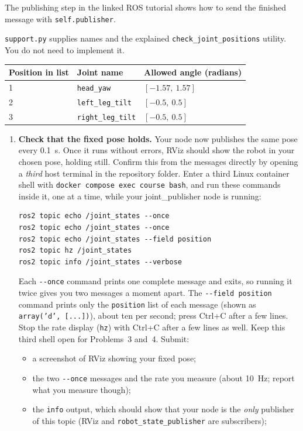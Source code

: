 \documentclass[12pt,letterpaper]{article}
\begin{document}
\begin{enumerate}[start=2]
\begin{enumerate}
The publishing step in the linked ROS
tutorial shows how to send the finished message with \texttt{self.publisher}.
\end{enumerate}
\texttt{support.py} supplies names and the explained
\texttt{check\_joint\_positions} utility. You do not need to implement it.

\begin{center}
\begin{tabular}{lll}
\hline
Position in list & Joint name & Allowed angle (radians) \\
\hline
1 & \texttt{head\_yaw} & $[-1.57,\ 1.57]$ \\
2 & \texttt{left\_leg\_tilt} & $[-0.5,\ 0.5]$ \\
3 & \texttt{right\_leg\_tilt} & $[-0.5,\ 0.5]$ \\
\hline
\end{tabular}
\end{center}

\begin{enumerate}[start=3]
\item \textbf{Check that the fixed pose holds.}
Your node now publishes the same pose every 0.1~s. Once it runs without
errors, RViz should show the robot in your chosen pose, holding still.
Confirm this from the messages directly by opening a \emph{third} host terminal
in the repository folder. Enter a third Linux container shell with
\texttt{docker compose exec course bash}, and run these commands inside it,
one at a time, while your joint\_publisher node is running:
\begin{lstlisting}
ros2 topic echo /joint_states --once
ros2 topic echo /joint_states --once
ros2 topic echo /joint_states --field position
ros2 topic hz /joint_states
ros2 topic info /joint_states --verbose
\end{lstlisting}
Each \texttt{-{}-once} command prints one complete message and exits, so
running it twice gives you two messages a moment apart. The
\texttt{-{}-field position} command prints only the \texttt{position} list of
each message (shown as \texttt{array('d', [...])}), about ten per second;
press Ctrl+C after a few lines. Stop the rate display (\texttt{hz}) with
Ctrl+C after a few lines as well. Keep this third shell open for
Problems~3 and~4. Submit:
\begin{itemize}
\item a screenshot of RViz showing your fixed pose;
\item the two \texttt{-{}-once} messages and the rate you measure (about 10~Hz;
report what you measure though);
\item the \texttt{info} output, which should show that your node is the
\emph{only} publisher of this topic (RViz and
\texttt{robot\_state\_publisher} are subscribers);
\end{itemize}
\end{enumerate}


\end{enumerate}
\end{document}
